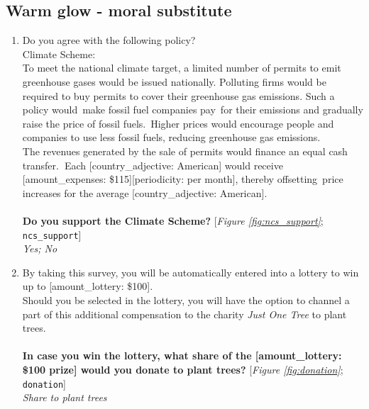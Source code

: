  \subsection*{Warm glow - moral substitute} 
 \begin{enumerate}[resume] 
\item  \label{q:ncs_support} Do you agree with the following policy?
~\\
Climate Scheme:~\\
To meet the national climate target, a limited number of permits to emit greenhouse gases would be issued nationally. Polluting firms would be required to buy permits to cover their greenhouse gas emissions. Such a policy would~make fossil fuel companies pay~for their emissions and gradually raise the price of fossil fuels.~Higher prices would encourage people and companies to use less fossil fuels, reducing greenhouse gas emissions.\\
The revenues generated by the sale of permits would finance an equal cash transfer.\textbf{~}Each [country\_adjective: American] would receive [amount\_expenses: \$115][periodicity: per month], thereby offsetting~price increases for the average [country\_adjective: American].\\
~\\
\textbf{Do you support the Climate Scheme?} [\textit{Figure \ref{fig:ncs_support}}; 
\verb|ncs_support|]
  \\ \textit{Yes; No}

\item  \label{q:donation} By taking this survey, you will be automatically entered into a lottery to win up to [amount\_lottery: \$100]. \\Should you be selected in the lottery, you will have the option to channel a part of this additional compensation to the charity \textit{Just One Tree} to plant trees.\\\\\textbf{In case you win the lottery, what share of the [amount\_lottery: \$100 prize] would you donate to plant trees?} [\textit{Figure \ref{fig:donation}}; 
\verb|donation|]
  \\ \textit{Share to plant trees}

\end{enumerate} 

